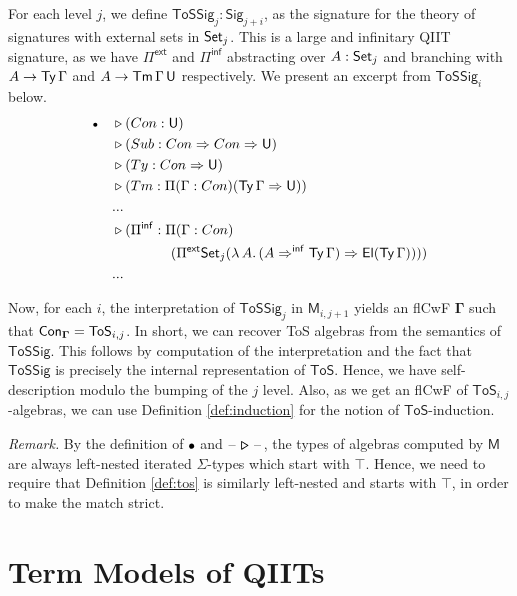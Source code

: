 \documentclass[sigplan,review,anonymous]{acmart}\settopmatter{printfolios=true,printccs=false,printacmref=false}
\newcommand{\ToS}{\mathsf{ToS}}
\newcommand{\ext}{\triangleright}
\newcommand{\emptycon}{\scaleobj{.75}\bullet}
\newcommand{\Pii}{\Pi}
\newcommand{\Pie}{\Pi^{\mathsf{ext}}}
\newcommand{\Piinf}{\Pi^{\mathsf{inf}}}
\newcommand{\Sig}{\mathsf{Sig}}
\newcommand{\ToSSig}{\mathsf{ToSSig}}
\newcommand{\arri}{\Rightarrow}
\newcommand{\arrinf}{\Rightarrow^{\mathsf{inf}}}
\newcommand{\bGamma}{\boldsymbol{\Gamma}}
\newcommand{\bemptycon}{\boldsymbol{\emptycon}}
\newcommand{\bM}{\boldsymbol{\mathsf{M}}}
\begin{document}
\begin{definition} For each level $j$,
we define $\ToSSig_j : \Sig_{j+i}$, as the signature for the theory of
signatures with external sets in $\mathsf{Set}_j$. This is a large and infinitary QIIT
signature, as we have $\Pie$ and $\Piinf$ abstracting over $A : \mathsf{Set}_j$ and
branching with $A \rightarrow \mathsf{Ty}\,\Gamma$ and $A \rightarrow \mathsf{Tm}\,\Gamma\,\mathsf{U}$ respectively. We
present an excerpt from $\ToSSig_i$ below.
\begin{alignat*}{3}
  & \emptycon && \ext (Con : \U)\\
  &           && \ext (Sub : Con\arri Con \arri \U)\\
  &           && \ext (Ty  : Con\arri\U)\\
  &           && \ext (Tm  : \Pii(\Gamma : Con)(\Ty\,\Gamma \arri \U))\\
  &           && ...\\
  &           && \ext (\Piinf : \Pii(\Gamma : Con)\\
  &           && \hspace{4.2em}(\Pie \Set_j (\lambda\,A.\,(A \arrinf \Ty\,\Gamma)\arri\El(\Ty\,\Gamma))))\\
  &           && ...
\end{alignat*}
\end{definition}

Now, for each $i$, the interpretation of $\ToSSig_j$ in $\bM_{i,j+1}$ yields an
flCwF $\bGamma$ such that $\Con_{\bGamma} = \ToS_{i,j}$. In short, we can
recover ToS algebras from the semantics of $\ToSSig$. This follows by
computation of the interpretation and the fact that $\ToSSig$ is precisely the
internal representation of $\ToS$. Hence, we have self-description modulo the
bumping of the $j$ level. Also, as we get an flCwF of $\ToS_{i,j}$-algebras, we
can use Definition \ref{def:induction} for the notion of $\ToS$-induction.

\emph{Remark.} By the definition of $\bemptycon$ and
$\boldsymbol{\blank\ext\blank}$, the types of algebras computed by $\bM$ are
always left-nested iterated $\Sigma$-types which start with $\top$. Hence, we
need to require that Definition \ref{def:tos} is similarly left-nested and
starts with $\top$, in order to make the match strict.

\section{Term Models of QIITs}
\label{sec:termmodels}
\end{document}
